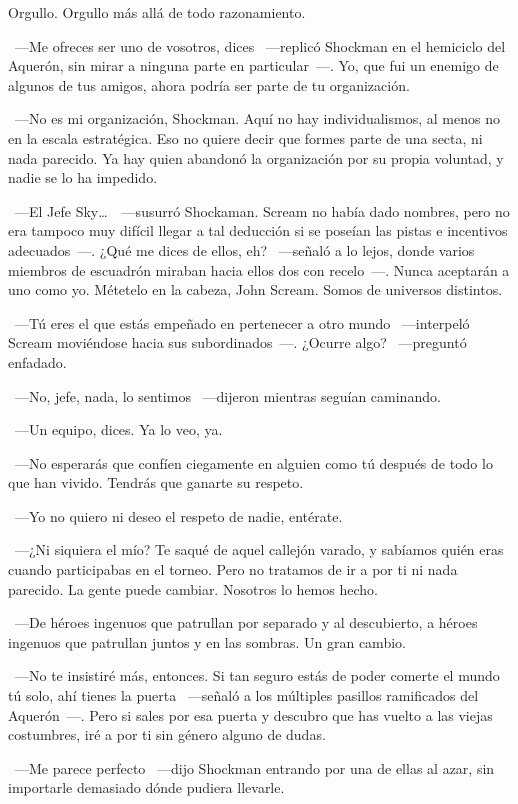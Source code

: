 Orgullo. Orgullo más allá de todo razonamiento.

~---Me ofreces ser uno de vosotros, dices ~---replicó Shockman en el hemiciclo del Aquerón, sin mirar a ninguna parte en particular~---. Yo, que fui un enemigo de algunos de tus amigos, ahora podría ser parte de tu organización.

~---No es mi organización, Shockman. Aquí no hay individualismos, al menos no en la escala estratégica. Eso no quiere decir que formes parte de una secta, ni nada parecido. Ya hay quien abandonó la organización por su propia voluntad, y nadie se lo ha impedido.

~---El Jefe Sky\dots\ ~---susurró Shockaman. Scream no había dado nombres, pero no era tampoco muy difícil llegar a tal deducción si se poseían las pistas e incentivos adecuados~---. ¿Qué me dices de ellos, eh? ~---señaló a lo lejos, donde varios miembros de escuadrón miraban hacia ellos dos con recelo~---. Nunca aceptarán a uno como yo. Métetelo en la cabeza, John Scream. Somos de universos distintos.

~---Tú eres el que estás empeñado en pertenecer a otro mundo ~---interpeló Scream moviéndose hacia sus subordinados~---. ¿Ocurre algo? ~---preguntó enfadado.

~---No, jefe, nada, lo sentimos ~---dijeron mientras seguían caminando.

~---Un equipo, dices. Ya lo veo, ya.

~---No esperarás que confíen ciegamente en alguien como tú después de todo lo que han vivido. Tendrás que ganarte su respeto.

~---Yo no quiero ni deseo el respeto de nadie, entérate.

~---¿Ni siquiera el mío? Te saqué de aquel callejón varado, y sabíamos quién eras cuando participabas en el torneo. Pero no tratamos de ir a por ti ni nada parecido. La gente puede cambiar. Nosotros lo hemos hecho.

~---De héroes ingenuos que patrullan por separado y al descubierto, a héroes ingenuos que patrullan juntos y en las sombras. Un gran cambio.

~---No te insistiré más, entonces. Si tan seguro estás de poder comerte el mundo tú solo, ahí tienes la puerta ~---señaló a los múltiples pasillos ramificados del Aquerón~---. Pero si sales por esa puerta y descubro que has vuelto a las viejas costumbres, iré a por ti sin género alguno de dudas.

~---Me parece perfecto ~---dijo Shockman entrando por una de ellas al azar, sin importarle demasiado dónde pudiera llevarle.

